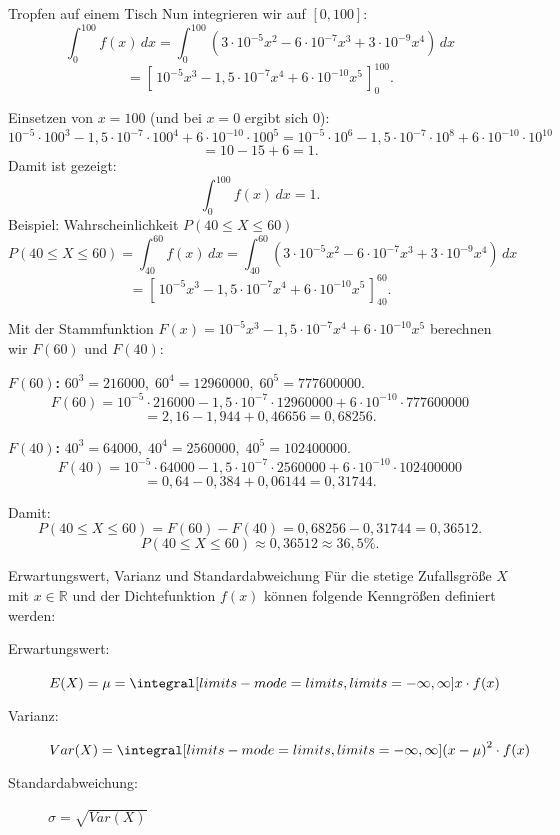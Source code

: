 \begin{bsp}{Tropfen auf einem Tisch}{}
Nun integrieren wir auf $[0,100]$:
\[
\int_0^{100} f(x)\,dx
=
\int_0^{100}\left(3\cdot10^{-5}x^2-6\cdot10^{-7}x^3+3\cdot10^{-9}x^4\right)\,dx
\]
\[
=
\left[\,10^{-5}x^3-1{,}5\cdot10^{-7}x^4+6\cdot10^{-10}x^5\,\right]_{0}^{100}.
\]

Einsetzen von $x=100$ (und bei $x=0$ ergibt sich $0$):
\[
10^{-5}\cdot 100^3-1{,}5\cdot10^{-7}\cdot 100^4+6\cdot10^{-10}\cdot 100^5
=
10^{-5}\cdot 10^6-1{,}5\cdot10^{-7}\cdot 10^8+6\cdot10^{-10}\cdot 10^{10}
\]
\[
=10-15+6=1.
\]
Damit ist gezeigt:
\[
\boxed{\int_{0}^{100} f(x)\,dx=1.}
\]
Beispiel: Wahrscheinlichkeit $P(40\le X\le 60)$
\[
P(40\le X\le 60)=\int_{40}^{60} f(x)\,dx
=\int_{40}^{60}\left(3\cdot10^{-5}x^2-6\cdot10^{-7}x^3+3\cdot10^{-9}x^4\right)\,dx
\]
\[
=
\left[\,10^{-5}x^3-1{,}5\cdot10^{-7}x^4+6\cdot10^{-10}x^5\,\right]_{40}^{60}.
\]

Mit der Stammfunktion $F(x)=10^{-5}x^3-1{,}5\cdot10^{-7}x^4+6\cdot10^{-10}x^5$ berechnen wir $F(60)$ und $F(40)$:

\medskip
\textbf{$F(60)$:}\quad
$60^3=216000,\;60^4=12960000,\;60^5=777600000$.
\[
F(60)=10^{-5}\cdot216000-1{,}5\cdot10^{-7}\cdot12960000+6\cdot10^{-10}\cdot777600000
\]
\[
=2{,}16-1{,}944+0{,}46656=0{,}68256.
\]

\textbf{$F(40)$:}\quad
$40^3=64000,\;40^4=2560000,\;40^5=102400000$.
\[
F(40)=10^{-5}\cdot64000-1{,}5\cdot10^{-7}\cdot2560000+6\cdot10^{-10}\cdot102400000
\]
\[
=0{,}64-0{,}384+0{,}06144=0{,}31744.
\]

Damit:
\[
P(40\le X\le 60)=F(60)-F(40)=0{,}68256-0{,}31744=0{,}36512.
\]
\[
\boxed{P(40\le X\le 60)\approx 0{,}36512\approx 36{,}5\%.}
\]
\end{bsp}
\begin{defi}{Erwartungswert, Varianz und Standardabweichung}{}
  Für die stetige Zufallsgröße \(X\) mit \(x\in \mathds{R}\) und der Dichtefunktion \(f(x)\) können folgende Kenngrößen definiert werden:
  \begin{description}
      \item[Erwartungswert:] \(E(X) = \mu = \integral[limits-mode=limits,limits={-\infty, \infty}]{x \cdot f(x)}\) 
      \item[Varianz:] \(Var(X) =  \integral[limits-mode=limits,limits={-\infty, \infty}]{\left(x-\mu \right)^2 \cdot f(x)}\) 
      \item[Standardabweichung:] \(\sigma = \sqrt{Var(X)}\) 
  \end{description}  
\end{defi}

